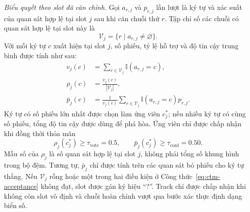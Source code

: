 \documentclass[../DoAn.tex]{subfiles}
\begin{document}
\textit{Biểu quyết theo slot đã căn chỉnh.}
Gọi $a_{r,j}$ và $p_{r,j}$ lần lượt là ký tự và xác suất của quan sát hợp lệ
tại slot $j$ sau khi căn chuỗi thứ $r$. Tập chỉ số các chuỗi có quan sát hợp lệ
tại slot này là
\begin{equation}
\mathcal{V}_j=\{r\mid a_{r,j}\neq\varnothing\}.
\end{equation}
Với mỗi ký tự $c$ xuất hiện tại slot $j$, số phiếu, tỷ lệ hỗ trợ và độ tin cậy
trung bình được tính như sau:
\begin{equation}
\begin{aligned}
v_j(c)&=\sum_{r\in\mathcal{V}_j}\mathbb{I}(a_{r,j}=c),\\
\rho_j(c)&=\frac{v_j(c)}{|\mathcal{V}_j|},\\
\bar{p}_j(c)&=\frac{1}{v_j(c)}
    \sum_{r\in\mathcal{V}_j}\mathbb{I}(a_{r,j}=c)p_{r,j}.
\end{aligned}
\label{eq:ctm-vote-statistics}
\end{equation}
Ký tự có số phiếu lớn nhất được chọn làm ứng viên $c_j^{*}$; nếu nhiều ký tự
có cùng số phiếu, tổng độ tin cậy được dùng để phá hòa. Ứng viên chỉ được chấp
nhận khi đồng thời thỏa mãn
\begin{equation}
\rho_j(c_j^{*})\geq\tau_{\mathrm{vote}}=0.5,
\qquad
\bar{p}_j(c_j^{*})\geq\tau_{\mathrm{conf}}=0.50.
\label{eq:ctm-acceptance}
\end{equation}
Mẫu số của $\rho_j$ là số quan sát hợp lệ tại slot $j$, không phải tổng số
khung hình trong bộ đệm. Tương tự, $\bar{p}_j$ chỉ được tính trên các quan sát
bỏ phiếu cho ký tự thắng. Nếu $\mathcal{V}_j$ rỗng hoặc một trong hai điều kiện
ở Công thức~\eqref{eq:ctm-acceptance} không đạt, slot được gán ký hiệu ``?''.
Track chỉ được chấp nhận khi không còn slot vô định và chuỗi hoàn chỉnh vượt
qua bước xác thực định dạng biển số.
\end{document}
